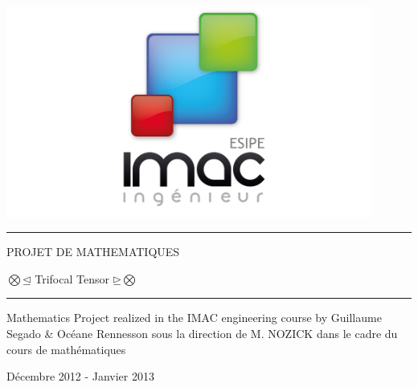 \documentclass[a4paper,11pt,fleqn]{report}
\author{Guillaume SEGADO \and Oc\'eane RENNESSON}
\begin{document}
	
	\begin{titlepage}
	\begin{center}\includegraphics[width=0.90\textwidth]{./logoimac.jpg}\end{center}
	\vspace*{2cm}
	\hrule
	\begin{center} {\Huge PROJET DE MATHEMATIQUES}\end{center}
	\vspace*{0.5cm}
	\begin{center} \begin{em}{\LARGE $\bigotimes\unlhd$ Trifocal Tensor $\unrhd\bigotimes$}\end{em}\end{center}
	\hrule
	\vspace*{5cm}
	 {\Large Mathematics Project realized in the IMAC engineering course by Guillaume Segado \& Oc\'eane Rennesson sous la direction de M. NOZICK dans le cadre du cours de math\'ematiques}
	\vspace*{1cm}
	\begin{center}D\'ecembre 2012 - Janvier 2013 \end{center}
	\end{titlepage}
	
\end{document}

